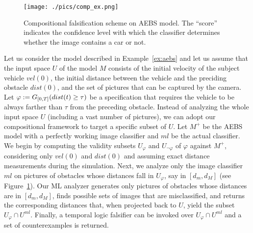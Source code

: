 \begin{figure}
  	\begin{center}
    		\texttt{[image: ./pics/comp\_ex.png]}
	 \end{center}
  	\caption{Compositional falsification scheme on AEBS model. The ``score'' indicates the confidence level with which the classifier determines whether the image contains a car or not.\label{fig:comp_ex}}
\end{figure}

\begin{example}
Let us consider the model described in Example~\ref{ex:aebs}
and let us assume that the input space $U$ of the model $M$ consists of the
initial velocity of the subject vehicle $vel(0)$, the initial
distance between the vehicle and the preciding obstacle $dist(0)$,
and the set of pictures that can be captured by the camera.
Let $\varphi := G_{[0,T]}(dist(t) \geq \tau)$ be a specification that 
requires the vehicle to be always 
farther than $\tau$ from the preceding obstacle.
Instead of analyzing the whole input space $U$ (including a vast number of pictures),
we can adopt our compositional framework to target a 
specific subset of $U$. 
Let $M^+$ be the AEBS model with a perfectly working image classifier
and $ml$ be the actual classifier. We begin by computing the
validity subsets $U_{\varphi}$ and $U_{\neg\varphi}$ of $\varphi$ against $M^+$, considering only $vel(0)$
and $dist(0)$ and assuming exact distance measurements during the
simulation. Next, we analyze only the image classifier $ml$
on pictures of obstacles whose distances fall in $U_{\varphi}$, say in $[d_m,d_M]$ (see Figure~\ref{fig:comp_ex}).
Our ML analyzer generates only pictures of obstacles whose distances are in
$[d_m,d_M]$, finds possible sets of images that are misclassified, and
returns the corresponding distances that, when projected back to $U$,
yield the subset $U_{\varphi} \cap U^{ml}$.
Finally, a temporal logic falsifier can be invoked over
$U_{\varphi} \cap U^{ml}$ and a set of counterexamples is returned.


\end{example}

